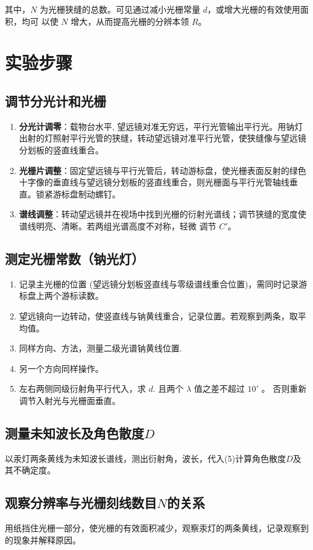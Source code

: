 \documentclass[a4paper,8pt,twocolumn]{article}
\begin{document}
  其中，$N$ 为光栅狭缝的总数。可见通过减小光栅常量 $d$，或增大光栅的有效使用面积，均可
  以使 $N$ 增大，从而提高光栅的分辨本领 $R$。

\section{实验步骤}
 \subsection{调节分光计和光栅}
  \begin{enumerate}
    \item \textbf{分光计调零}：载物台水平, 望远镜对准无穷远，平行光管输出平行光。用钠灯出射的灯照射平行光管的狭缝，转动望远镜对准平行光管，使狭缝像与望远镜分划板的竖直线重合。
    \item \textbf{光栅片调整}：固定望远镜与平行光管后，转动游标盘，使光栅表面反射的绿色十字像的垂直线与望远镜分划板的竖直线重合，则光栅面与平行光管轴线垂直。锁紧游标盘制动螺钉。
    \item \textbf{谱线调整}：转动望远镜并在视场中找到光栅的衍射光谱线；调节狭缝的宽度使谱线明亮、清晰。若两组光谱高度不对称，轻微
    调节 $C'$。
  \end{enumerate}

 \subsection{测定光栅常数（钠光灯）}
  \begin{enumerate}
    \item 记录主光栅的位置 (望远镜分划板竖直线与零级谱线重合位置)，需同时记录游标盘上两个游标读数。
    \item 望远镜向一边转动，使竖直线与钠黄线重合，记录位置。若观察到两条，取平均值。
    \item 同样方向、方法，测量二级光谱钠黄线位置.
    \item 另一个方向同样操作。
    \item 左右两侧同级衍射角平行代入，求 $d$. 且两个 $\lambda$ 值之差不超过 $10'$ 。 否则重新调节入射光与光栅面垂直。
  \end{enumerate}

 \subsection{测量未知波长及角色散度$D$}
  以汞灯两条黄线为未知波长谱线，测出衍射角，波长，代入(5)计算角色散度$D$及其不确定度。

 \subsection{观察分辨率与光栅刻线数目$N$的关系}
  用纸挡住光栅一部分，使光栅的有效面积减少，观察汞灯的两条黄线，记录观察到的现象并解释原因。
\end{document}
